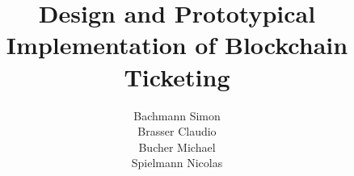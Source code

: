 \documentclass[12pt,a4paper,twoside]{book}
\begin{document}

\author{Bachmann Simon \\ Brasser Claudio \\ Bucher Michael \\ Spielmann Nicolas }
\title{Design and Prototypical Implementation of Blockchain Ticketing}
\submissiondate{\today}


\maketitle

\makeimprint





\tableofcontents

\cleardoublepage
{}




%
%








\listoffigures
{}
\listoftables


\end{document}
